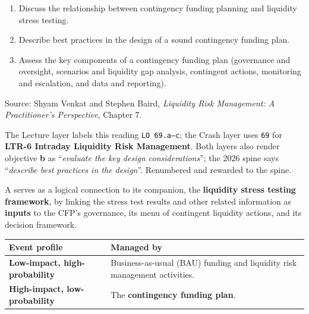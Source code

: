 
\begin{lrkeybox}
\begin{enumerate}[label=\textbf{\alph*.}]
\item Discuss the relationship between contingency funding planning and liquidity stress testing.
\item Describe best practices in the design of a sound contingency funding plan.
\item Assess the key components of a contingency funding plan (governance and oversight, scenarios and liquidity gap analysis, contingent actions, monitoring and escalation, and data and reporting).
\end{enumerate}
{\footnotesize\color{FRMGrey}Source: Shyam Venkat and Stephen Baird, \textit{Liquidity Risk Management: A Practitioner's Perspective}, Chapter 7.}
\end{lrkeybox}

\begin{lrtrapbox}
The Lecture layer labels this reading \texttt{LO 69.a--c}; the Crash layer uses \texttt{69} for \textbf{LTR-6 Intraday Liquidity Risk Management}. Both layers also render objective \textbf{b} as ``\emph{evaluate the key design considerations}''; the 2026 spine says ``\emph{describe best practices in the design}''. Renumbered and rewarded to the spine.
\end{lrtrapbox}


\begin{lrdefbox}
A  serves as a logical connection to its companion, the \textbf{liquidity stress testing framework}, by linking the stress test results and other related information as \textbf{inputs} to the CFP's governance, its menu of contingent liquidity actions, and its decision framework.
\end{lrdefbox}

\begin{center}
\small
\begin{tabularx}{\textwidth}{@{}p{5.3cm} X@{}}
\toprule
\rowcolor{FRMSoft}\textbf{Event profile} & \textbf{Managed by} \\
\midrule
\textbf{Low-impact, high-probability} & Business-as-usual (BAU) funding and liquidity risk management activities. \\
\addlinespace
\textbf{High-impact, low-probability} & The \textbf{contingency funding plan}. \\
\bottomrule
\end{tabularx}
\end{center}

